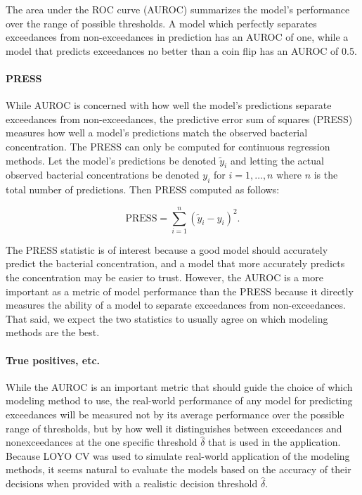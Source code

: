 \documentclass[english]{article}\usepackage[]{graphicx}\usepackage[]{color}
\numberwithin{equation}{section}
\numberwithin{figure}{section}
\renewcommand\[{\begin{equation}}
\renewcommand\]{\end{equation}}
\begin{document}
The area under the ROC curve (AUROC) summarizes the model's performance
over the range of possible thresholds. A model which perfectly separates
exceedances from non-exceedances in prediction has an AUROC of one,
while a model that predicts exceedances no better than a coin flip
has an AUROC of 0.5.


\paragraph*{PRESS}

While AUROC is concerned with how well the model's predictions separate
exceedances from non-exceedances, the predictive error sum of squares
(PRESS) measures how well a model's predictions match the observed
bacterial concentration. The PRESS can only be computed for continuous
regression methods. Let the model's predictions be denoted $\tilde{y}_{i}$
and letting the actual observed bacterial concentrations be denoted
$y_{i}$ for $i=1,\dots,n$ where $n$ is the total number of predictions.
Then PRESS computed as follows:

\[
\text{PRESS}=\sum_{i=1}^{n}\left(\tilde{y}_{i}-y_{i}\right)^{2}.
\]


The PRESS statistic is of interest because a good model should accurately
predict the bacterial concentration, and a model that more accurately
predicts the concentration may be easier to trust. However, the AUROC
is a more important as a metric of model performance than the PRESS
because it directly measures the ability of a model to separate exceedances
from non-exceedances. That said, we expect the two statistics to usually
agree on which modeling methods are the best.


\paragraph*{True positives, etc.}

While the AUROC is an important metric that should guide the choice
of which modeling method to use, the real-world performance of any
model for predicting exceedances will be measured not by its average
performance over the possible range of thresholds, but by how well
it distinguishes between exceedances and nonexceedances at the one
specific threshold $\hat{\delta}$ that is used in the application.
Because LOYO CV was used to simulate real-world application of the
modeling methods, it seems natural to evaluate the models based on
the accuracy of their decisions when provided with a realistic decision
threshold $\hat{\delta}$.
\end{document}

